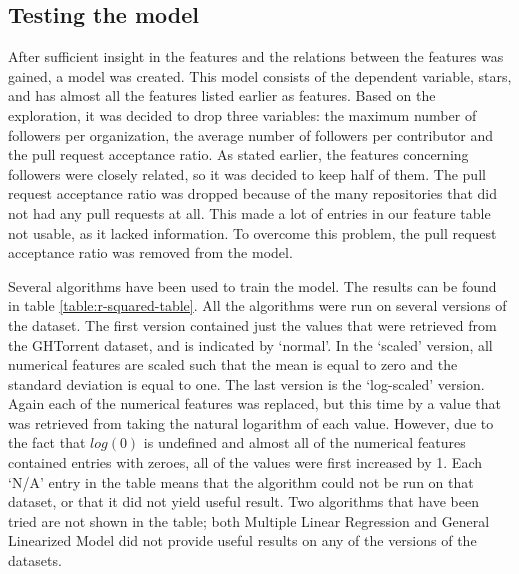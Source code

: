     \subsection{Testing the model}
        After sufficient insight in the features and the relations between the features was gained, a model was created. 
        This model consists of the dependent variable, stars, and has almost all the features listed earlier as features. 
        Based on the exploration, it was decided to drop three variables: the maximum number of followers per organization, the average number of followers per contributor and the pull request acceptance ratio.
        As stated earlier, the features concerning followers were closely related, so it was decided to keep half of them. 
        The pull request acceptance ratio was dropped because of the many repositories that did not had any pull requests at all. 
        This made a lot of entries in our feature table not usable, as it lacked information. 
        To overcome this problem, the pull request acceptance ratio was removed from the model.
        
        Several algorithms have been used to train the model. 
        The results can be found in table \ref{table:r-squared-table}.
        All the algorithms were run on several versions of the dataset. The first version contained just the values that were retrieved from the GHTorrent dataset, and is indicated by `normal'. 
        In the `scaled' version, all numerical features are scaled such that the mean is equal to zero and the standard deviation is equal to one. 
        The last version is the `log-scaled' version. 
        Again each of the numerical features was replaced, but this time by a value that was retrieved from taking the natural logarithm of each value.
        However, due to the fact that $log(0)$ is undefined and almost all of the numerical features contained entries with zeroes, all of the values were first increased by 1.
        Each `N/A' entry in the table means that the algorithm could not be run on that dataset, or that it did not yield useful result.
        Two algorithms that have been tried are not shown in the table; both Multiple Linear Regression and General Linearized Model did not provide useful results on any of the versions of the datasets.
        
